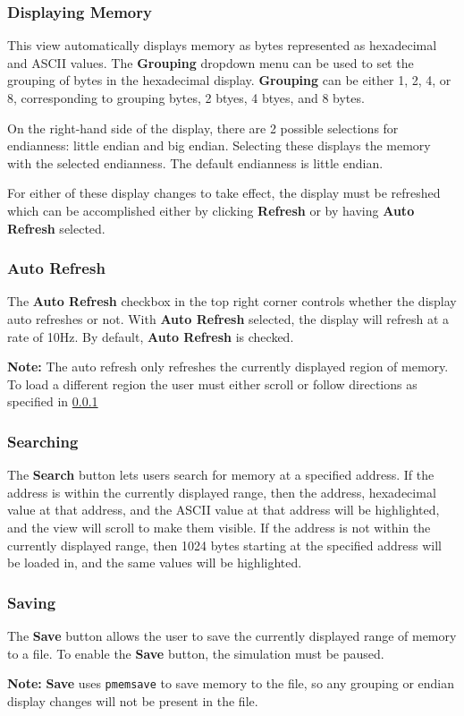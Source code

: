 \documentclass{article}
\newcommand{\code}[1]{\texttt{#1}}
\begin{document}
\subsubsection{Displaying Memory}\label{ReadMem}
This view automatically displays memory as bytes represented as hexadecimal and ASCII values. The \textbf{Grouping} dropdown menu can be used to set the grouping of bytes in the hexadecimal display. \textbf{Grouping} can be either 1, 2, 4, or 8, corresponding to grouping bytes, 2 btyes, 4 btyes, and 8 bytes. \par
On the right-hand side of the display, there are 2 possible selections for endianness: little endian and big endian. Selecting these displays the memory with the selected endianness. The default endianness is little endian. \par
For either of these display changes to take effect, the display must be refreshed which can be accomplished either by clicking \textbf{Refresh} or by having \textbf{Auto Refresh} selected.

\subsubsection{Auto Refresh}
The \textbf{Auto Refresh} checkbox in the top right corner controls whether the display auto refreshes or not. With \textbf{Auto Refresh} selected, the display will refresh at a rate of 10Hz. By default, \textbf{Auto Refresh} is checked.\par
\textbf{Note:} The auto refresh only refreshes the currently displayed region of memory. To load a different region the user must either scroll or follow directions as specified in \ref{ReadMem}

\subsubsection{Searching}
The \textbf{Search} button lets users search for memory at a specified address. If the address is within the currently displayed range, then the address, hexadecimal value at that address, and the ASCII value at that address will be highlighted, and the view will scroll to make them visible. If the address is not within the currently displayed range, then 1024 bytes starting at the specified address will be loaded in, and the same values will be highlighted.

\subsubsection{Saving}
The \textbf{Save} button allows the user to save the currently displayed range of memory to a file. To enable the \textbf{Save} button, the simulation must be paused.\par
\textbf{Note:} \textbf{Save} uses \code{pmemsave} to save memory to the file, so any grouping or endian display changes will not be present in the file.
\end{document}
